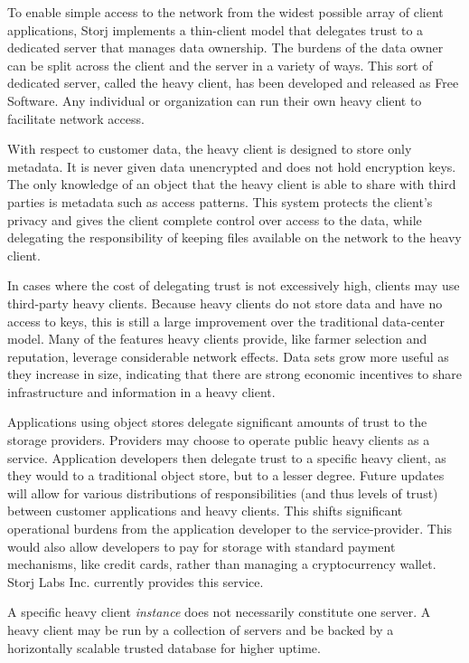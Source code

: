 \documentclass[a4paper,10pt]{article} \usepackage[utf8]{inputenc}
\begin{document}
To enable simple access to the network from the widest possible array of client
applications, Storj implements a thin-client model that delegates trust to a
dedicated server that manages data ownership. The burdens of the
data owner can be split across the client and the server in a variety of ways.
This sort of dedicated server, called the heavy client, has been developed and
released as Free Software. Any individual or organization can run their own
heavy client to facilitate network access.

With respect to customer data, the heavy client is designed to store only
metadata. It is never given data unencrypted and does not hold encryption keys.
The only knowledge of an object that the heavy client is able to share with
third parties is metadata such as access patterns. This system protects the
client's privacy and gives the client complete control over access to the data,
while delegating the responsibility of keeping files available on the network
to the heavy client.

In cases where the cost of delegating trust is not excessively high,
clients may use third-party heavy clients. Because heavy clients do not store
data and have no access to keys, this is still a large improvement over the
traditional data-center model. Many of the features heavy clients provide, like
farmer selection and reputation, leverage considerable network effects. Data
sets grow more useful as they increase in size, indicating that there are
strong economic incentives to share infrastructure and information in a heavy
client.

Applications using object stores delegate significant amounts of trust to the
storage providers. Providers may choose to operate public heavy clients as a
service.
Application developers then delegate trust to a specific heavy client, as they
would to a traditional object store, but to a lesser degree. Future updates
will allow for various distributions of responsibilities (and thus levels of
trust) between customer applications and heavy clients. This shifts significant
operational burdens from the application developer to the service-provider.
This would also allow developers to pay for storage with standard payment
mechanisms, like credit cards, rather than managing a cryptocurrency wallet.
Storj Labs Inc. currently provides this service.

A specific heavy client {\em instance} does not necessarily constitute one
server. A heavy client may be run by a collection of servers and be backed by
a horizontally scalable trusted database for higher uptime.
\end{document}
